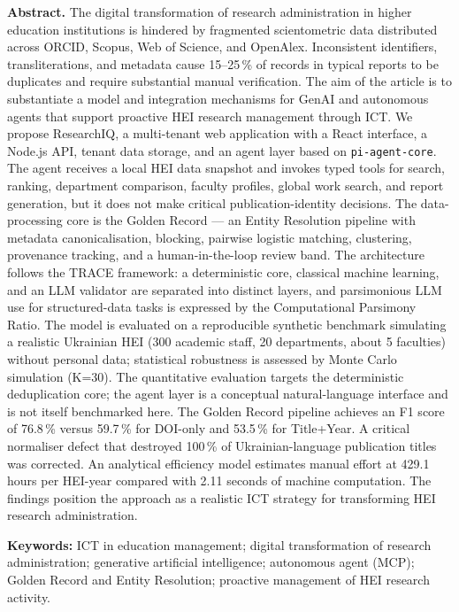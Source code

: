 \textbf{Abstract.} The digital transformation of research administration in higher education institutions is hindered by fragmented scientometric data distributed across ORCID, Scopus, Web of Science, and OpenAlex. Inconsistent identifiers, transliterations, and metadata cause 15--25\,\% of records in typical reports to be duplicates and require substantial manual verification. The aim of the article is to substantiate a model and integration mechanisms for GenAI and autonomous agents that support proactive HEI research management through ICT. We propose ResearchIQ, a multi-tenant web application with a React interface, a Node.js API, tenant data storage, and an agent layer based on \texttt{pi-agent-core}. The agent receives a local HEI data snapshot and invokes typed tools for search, ranking, department comparison, faculty profiles, global work search, and report generation, but it does not make critical publication-identity decisions. The data-processing core is the Golden Record --- an Entity Resolution pipeline with metadata canonicalisation, blocking, pairwise logistic matching, clustering, provenance tracking, and a human-in-the-loop review band. The architecture follows the TRACE framework: a deterministic core, classical machine learning, and an LLM validator are separated into distinct layers, and parsimonious LLM use for structured-data tasks is expressed by the Computational Parsimony Ratio. The model is evaluated on a reproducible synthetic benchmark simulating a realistic Ukrainian HEI (300 academic staff, 20 departments, about 5 faculties) without personal data; statistical robustness is assessed by Monte Carlo simulation (K=30). The quantitative evaluation targets the deterministic deduplication core; the agent layer is a conceptual natural-language interface and is not itself benchmarked here. The Golden Record pipeline achieves an F1 score of 76.8\,\% versus 59.7\,\% for DOI-only and 53.5\,\% for Title+Year. A critical normaliser defect that destroyed 100\,\% of Ukrainian-language publication titles was corrected. An analytical efficiency model estimates manual effort at 429.1 hours per HEI-year compared with 2.11 seconds of machine computation. The findings position the approach as a realistic ICT strategy for transforming HEI research administration.

\textbf{Keywords:} ICT in education management; digital transformation of research administration; generative artificial intelligence; autonomous agent (MCP); Golden Record and Entity Resolution; proactive management of HEI research activity.
